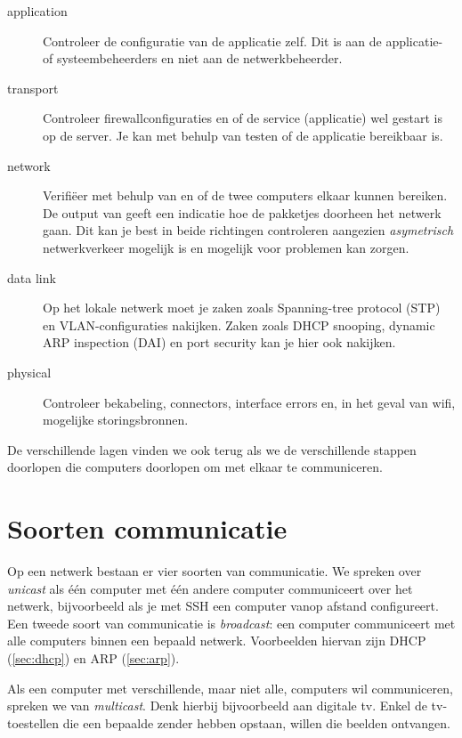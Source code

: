 \begin{description}
\item[application]
   Controleer de configuratie van de applicatie zelf.
   Dit is aan de applicatie- of systeembeheerders en niet aan de netwerkbeheerder.
\item[transport]
   Controleer firewallconfiguraties en of de service (applicatie) wel gestart is op de server.
   Je kan met behulp van  testen of de applicatie bereikbaar is.
\item[network]
   Verifiëer met behulp van  en  of de twee computers elkaar kunnen bereiken.
   De output van  geeft een indicatie hoe de pakketjes doorheen het netwerk gaan.
   Dit kan je best in beide richtingen controleren aangezien \emph{asymetrisch} netwerkverkeer mogelijk is en mogelijk voor problemen kan zorgen.
\item[data link]
   Op het lokale netwerk moet je zaken zoals Spanning-tree protocol (STP) en VLAN-configuraties nakijken.
   Zaken zoals DHCP snooping, dynamic ARP inspection (DAI) en port security kan je hier ook nakijken.
\item[physical]
  Controleer bekabeling, connectors, interface errors en, in het geval van wifi, mogelijke storingsbronnen.
\end{description}

De verschillende lagen vinden we ook terug als we de verschillende stappen doorlopen die computers doorlopen om met elkaar te communiceren.




\section{Soorten communicatie}

Op een netwerk bestaan er vier soorten van communicatie.
We spreken over \emph{unicast} als één computer met één andere computer communiceert over het netwerk, bijvoorbeeld als je met SSH een computer vanop afstand configureert.
Een tweede soort van communicatie is \emph{broadcast}: een computer communiceert met alle computers binnen een bepaald netwerk.
Voorbeelden hiervan zijn DHCP (\vref{sec:dhcp}) en ARP (\vref{sec:arp}).

Als een computer met verschillende, maar niet alle, computers wil communiceren, spreken we van \emph{multicast}.
Denk hierbij bijvoorbeeld aan digitale tv.
Enkel de tv-toestellen die een bepaalde zender hebben opstaan, willen die beelden ontvangen.

